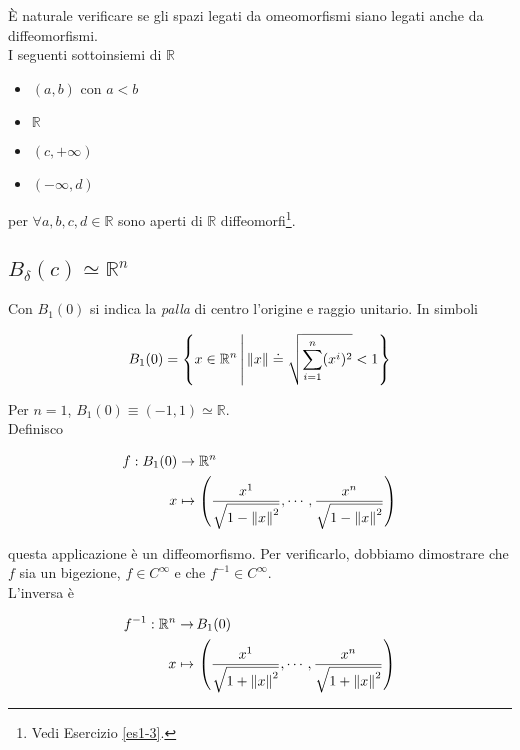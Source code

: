 \`{E} naturale verificare se gli spazi legati da omeomorfismi siano legati anche da diffeomorfismi.\\
I seguenti sottoinsiemi di $ \mathbb{R} $

\begin{itemize}
	\item $ (a,b) $ con $ a < b $
	
	\item $ \mathbb{R} $
	
	\item $ (c, + \infty) $
	
	\item $ (- \infty, d) $
\end{itemize}

per  $ \forall a,b,c,d \in \mathbb{R} $ sono aperti di $ \mathbb{R} $ diffeomorfi\footnote{%
	Vedi Esercizio \ref{es1-3}.%
}.

\subsection{$ B_{\delta} (c) \simeq \mathbb{R}^{n} $}

Con $ B_{1} (0) $ si indica la \textit{palla} di centro l'origine e raggio unitario. In simboli

\begin{equation}
	B_{1} (0) = \left\{ x \in \mathbb{R}^{n} \, \middle| \, \norm{x} \doteq \sqrt{\sum_{i=1}^{n} (x^{i})^{2}} < 1 \right\}
\end{equation}

Per $ n=1 $, $ B_{1} (0) \equiv (-1,1) \simeq \mathbb{R} $.\\
Definisco

\begin{align}
	\begin{split}
		f : B_{1} (0) &\to \mathbb{R}^{n}\\
		x &\mapsto \left( \dfrac{x^{1}}{\sqrt{1 - \norm{x}^{2}}}, \cdots, \dfrac{x^{n}}{\sqrt{1 - \norm{x}^{2}}} \right)
	\end{split}	
\end{align}

questa applicazione è un diffeomorfismo. Per verificarlo, dobbiamo dimostrare che $ f $ sia un bigezione, $ f \in C^{\infty} $ e che $ f^{-1} \in C^{\infty} $.\\
L'inversa è

\begin{align}
	\begin{split}
		f^{-1} : \mathbb{R}^{n} \to& \, B_{1} (0)\\
		x \mapsto& \, \left( \dfrac{x^{1}}{\sqrt{1 + \norm{x}^{2}}}, \cdots, \dfrac{x^{n}}{\sqrt{1 + \norm{x}^{2}}} \right)
	\end{split}
\end{align}

